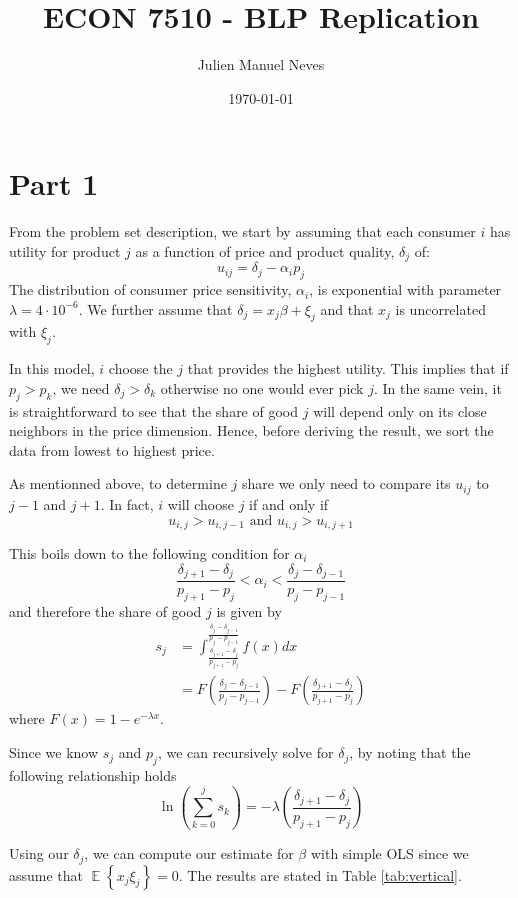 \documentclass[12pt]{article}
\title{ECON 7510 - BLP Replication}
\date{\today}
\author{Julien Manuel Neves}
\newcommand{\1}{{\bf 1}} %
\DeclareMathOperator{\E}{\mathbb{E}} %
\newcommand{\Ex}[1]{\E\left\{#1\right\}} %
\begin{document}
\maketitle

\section*{Part 1}

From the problem set description, we start by assuming that each consumer $i$
has utility for product $j$ as a function of price and product quality, $\delta_j$ of:
\[
u_{ij} =\delta_j -\alpha_i p_j
\]
The distribution of consumer price sensitivity, $\alpha_i$, is exponential with parameter $\lambda = 4\cdot 10^{-6}$. We further assume that $\delta_j = x_j\beta +\xi_j$ and that $x_j$ is uncorrelated with $\xi_j$.

In this model, $i$ choose the $j$ that provides the highest utility. This implies that if $p_j>p_k$, we need $\delta_j>\delta_k$ otherwise no one would ever pick $j$. In the same vein, it is straightforward to see that the share of good $j$ will depend only on its close neighbors in the price dimension. Hence, before deriving the result, we sort the data from lowest to highest price.

As mentionned above, to determine $j$ share we only need to compare its $u_{ij}$ to $j-1$ and $j+1$. In fact, $i$ will choose $j$ if and only if
\[
u_{i,j}>u_{i,j-1} \text{ and } u_{i,j}>u_{i,j+1}
\]

This boils down to the following condition for $\alpha_i$
\[
\frac{\delta_{j+1}-\delta_{j}}{p_{j+1}-p_{j}}<\alpha_i<\frac{\delta_j-\delta_{j-1}}{p_j-p_{j-1}}
\]
and therefore the share of good $j$ is given by
\begin{align*}
	s_j&=\int_{\frac{\delta_{j+1}-\delta_{j}}{p_{j+1}-p_{j}}}^{\frac{\delta_j-\delta_{j-1}}{p_j-p_{j-1}}}f(x)dx\\
	& = F\left({\frac{\delta_j-\delta_{j-1}}{p_j-p_{j-1}}}\right) - F\left( {\frac{\delta_{j+1}-\delta_{j}}{p_{j+1}-p_{j}}}\right)
\end{align*}
where $F(x)= 1-e^{-\lambda x}$.

Since we know $s_j$ and $p_j$, we can recursively solve for $\delta_j$, by noting that the following relationship holds
\[
\ln\left(\sum_{k=0}^j s_k\right) = -\lambda \left({\frac{\delta_{j+1}-\delta_{j}}{p_{j+1}-p_{j}}}\right)
\]

Using our $\delta_j$, we can compute our estimate for $\beta$ with simple OLS since we assume that $\Ex{x_j\xi_j}=0$. The results are stated in Table \ref{tab:vertical}.
\end{document}
